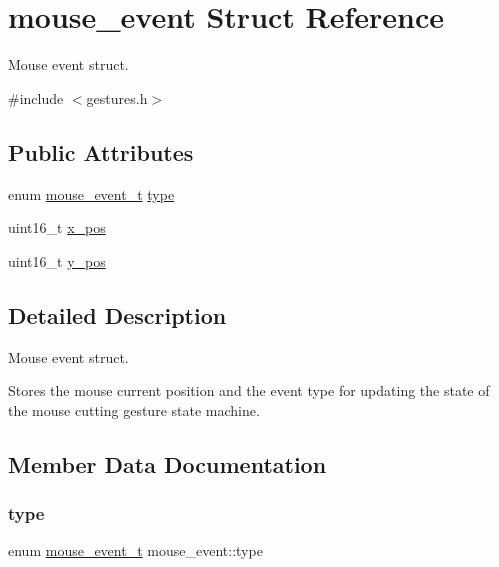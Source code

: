 \hypertarget{structmouse__event}{}\section{mouse\+\_\+event Struct Reference}
\label{structmouse__event}


Mouse event struct.  




{\ttfamily \#include $<$gestures.\+h$>$}

\subsection*{Public Attributes}
\begin{DoxyCompactItemize}
\item 
enum \hyperlink{gestures_8h_ad2dff3235fa4296c8e2924108a8f8000}{mouse\+\_\+event\+\_\+t} \hyperlink{structmouse__event_ac1172031da6e1990f412dc64fe07d814}{type}
\item 
uint16\+\_\+t \hyperlink{structmouse__event_a899bd00c25fa2673bf40fd098f6dd247}{x\+\_\+pos}
\item 
uint16\+\_\+t \hyperlink{structmouse__event_a2d28e7073d60258a58c16b09e0f3d12f}{y\+\_\+pos}
\end{DoxyCompactItemize}


\subsection{Detailed Description}
Mouse event struct. 

Stores the mouse current position and the event type for updating the state of the mouse cutting gesture state machine. 

\subsection{Member Data Documentation}
\mbox{\label{structmouse__event_ac1172031da6e1990f412dc64fe07d814}} 
\subsubsection{\texorpdfstring{type}{type}}
{\footnotesize\ttfamily enum \hyperlink{gestures_8h_ad2dff3235fa4296c8e2924108a8f8000}{mouse\+\_\+event\+\_\+t} mouse\+\_\+event\+::type}

